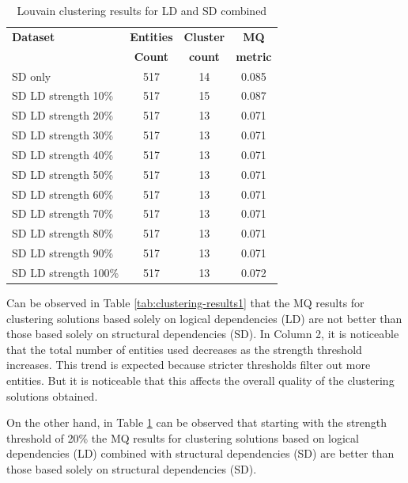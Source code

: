\documentclass[conference]{IEEEtran}
\begin{document}
\begin{table}[htbp]
  \centering
  \caption{Louvain clustering results for LD and SD combined}
  \label{tab:clustering-results2}
  \begin{tabular}{lc|c|c}
    \toprule
    \textbf{Dataset} & \textbf{Entities} & \textbf{Cluster} & \textbf{MQ } \\
    & \textbf{Count} & \textbf{count} &  \textbf{metric} \\
    \midrule
    SD only & 517 & 14 &  0.085  \\
    \midrule
SD  LD  strength    10\%    &   517 &   15  &   0.087   \\
SD  LD  strength    20\%    &   517 &   13  &   0.071   \\
SD  LD  strength    30\%    &   517 &   13  &   0.071   \\
SD  LD  strength    40\%    &   517 &   13  &   0.071   \\
SD  LD  strength    50\%    &   517 &   13  &   0.071   \\
SD  LD  strength    60\%    &   517 &   13  &   0.071   \\
SD  LD  strength    70\%    &   517 &   13  &   0.071   \\
SD  LD  strength    80\%    &   517 &   13  &   0.071   \\
SD  LD  strength    90\%    &   517 &   13  &   0.071   \\
SD  LD  strength    100\%   &   517 &   13  &   0.072   \\

    \bottomrule
  \end{tabular}
\end{table}

Can be observed in Table \ref{tab:clustering-results1} that the MQ results for clustering solutions based solely on logical dependencies (LD) are not better than those based solely on structural dependencies (SD). In Column 2, it is noticeable that the total number of entities used decreases as the strength threshold increases. This trend is expected because stricter thresholds filter out more entities. But it is noticeable that this affects the overall quality of the clustering solutions obtained.

On the other hand, in Table \ref{tab:clustering-results2} can be observed that starting with the strength threshold of 20\% the MQ results for clustering solutions based on logical dependencies (LD) combined with structural dependencies (SD) are better than those based solely on structural dependencies (SD). 
\end{document}
